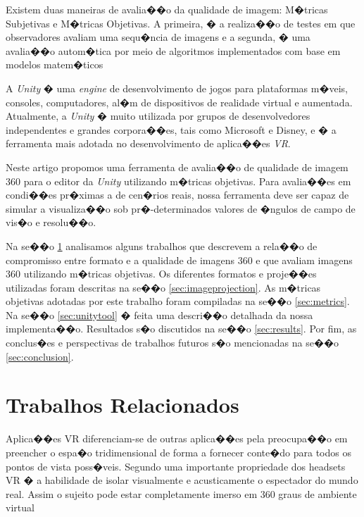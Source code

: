 \documentclass[12pt]{article}
\begin{document}
Existem duas maneiras de avalia��o da qualidade de imagem: M�tricas Subjetivas e M�tricas Objetivas. A primeira, � a realiza��o de testes em que observadores avaliam uma sequ�ncia de imagens e a segunda, � uma avalia��o autom�tica por meio de algoritmos implementados com base em modelos matem�ticos

A \textit{Unity} � uma \textit{engine} de desenvolvimento de jogos para plataformas m�veis, consoles, computadores, al�m de dispositivos de realidade virtual e aumentada. Atualmente, a \textit{Unity} � muito utilizada por grupos de desenvolvedores independentes e grandes corpora��es, tais como Microsoft e Disney, e � a ferramenta mais adotada no desenvolvimento de aplica��es \textit{VR}.

Neste artigo propomos uma ferramenta de avalia��o de qualidade de imagem 360 para o editor da \textit{Unity} utilizando m�tricas objetivas. Para avalia��es em condi��es pr�ximas a de cen�rios reais, nossa ferramenta deve ser capaz de simular a visualiza��o sob pr�-determinados valores de �ngulos de campo de vis�o e resolu��o.

Na se��o \ref{sec:relatedworks} analisamos alguns trabalhos que descrevem a rela��o de compromisso entre formato e a qualidade de imagens 360 e que avaliam imagens 360 utilizando m�tricas objetivas. Os diferentes formatos e proje��es utilizadas foram descritas na se��o \ref{sec:imageprojection}. As m�tricas objetivas adotadas por este trabalho foram compiladas na se��o \ref{sec:metrics}. Na se��o \ref{sec:unitytool} � feita uma descri��o detalhada da nossa implementa��o. Resultados s�o discutidos na se��o \ref{sec:results}. Por fim, as conclus�es e perspectivas de trabalhos futuros s�o mencionadas na se��o \ref{sec:conclusion}.

\section{Trabalhos Relacionados} \label{sec:relatedworks}

Aplica��es VR diferenciam-se de outras aplica��es pela preocupa��o em preencher o espa�o tridimensional de forma a fornecer conte�do para todos os pontos de vista poss�veis. Segundo \cite{fuchs2017virtual} uma importante propriedade dos headsets VR � a habilidade de isolar visualmente e acusticamente o espectador do mundo real. Assim o sujeito pode estar completamente imerso em 360 graus de ambiente virtual
\end{document}
